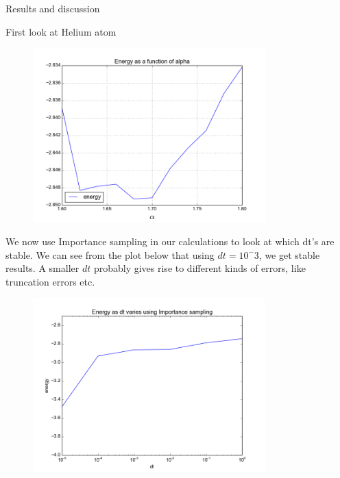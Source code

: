 \documentclass[a4paper, 12pt, titlepage]{article}
\begin{document}
\begin{section}{Results and discussion}
\begin{subsection}{First look at Helium atom}
 \begin{figure}[H]
 	\centering
 	\includegraphics[width=0.8\textwidth]{../python_programs/EnergyVariance_helium2.png}
 	\label{Helium2}
 \end{figure}

 We now use Importance sampling in our calculations to look at which dt's are stable. 
 We can see from the plot below that using $dt = 10^-3$, we get stable results. A smaller $dt$ probably gives rise to different kinds of errors, like truncation errors etc.  
 \begin{figure}[H] 
 	\centering
 	\includegraphics[width=0.8\textwidth]{../python_programs/ImportanceSampling_Helium_dt.png}
 \end{figure}


\end{subsection}
\end{section}
\end{document}
